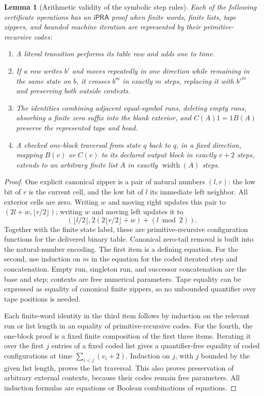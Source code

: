 \documentclass[11pt]{article}
\newtheorem{lemma}{Lemma}
\newcommand{\ipra}{\mathsf{iPRA}}
\begin{document}
\begin{lemma}[Arithmetic validity of the symbolic step rules]
Each of the following certificate operations has an $\ipra$ proof when
finite words, finite lists, tape zippers, and bounded machine iteration are
represented by their primitive-recursive codes:
\begin{enumerate}
\item A literal transition performs its table row and adds one to time.
\item If a row writes $b'$ and moves repeatedly in one direction while
      remaining in the same state on $b$, it crosses $b^m$ in exactly $m$
      steps, replacing it with $b'^m$ and preserving both outside contexts.
\item The identities combining adjacent equal-symbol runs, deleting empty
      runs, absorbing a finite zero suffix into the blank exterior, and
      $C(A)1=1B(A)$ preserve the represented tape and head.
\item A checked one-block traversal from state $q$ back to $q$, in a fixed
      direction, mapping $B(v)$ or $C(v)$ to its declared output block in
      exactly $v+2$ steps, extends to an arbitrary finite list $A$ in
      exactly $\operatorname{width}(A)$ steps.
\end{enumerate}
\end{lemma}
\begin{proof}
One explicit canonical zipper is a pair of natural numbers $(l,r)$:
the low bit of $r$ is the current cell, and the low bit of $l$ its immediate
left neighbor. All exterior cells are zero. Writing $w$ and moving right
updates this pair to $(2l+w,\lfloor r/2\rfloor)$; writing $w$ and moving
left updates it to
\[
 (\lfloor l/2\rfloor,
 2(2\lfloor r/2\rfloor+w)+(l\bmod2)).
\]
Together with the finite state label, these are primitive-recursive
configuration functions for the delivered binary table. Canonical
zero-tail removal is built into the natural-number encoding.
The first item is a defining equation. For the second, use induction on
$m$ in the equation for the coded iterated step and concatenation. Empty
run, singleton run, and successor concatenation are the base and step;
contexts are free numerical parameters. Tape equality can be expressed
as equality of canonical finite zippers, so no unbounded quantifier over
tape positions is needed.

Each finite-word identity in the third item follows by induction on the
relevant run or list length in an equality of primitive-recursive codes.
For the fourth, the one-block proof is a fixed finite composition of the
first three items. Iterating it over the first $j$ entries of a fixed
coded list gives a quantifier-free equality of coded configurations at
time $\sum_{i<j}(v_i+2)$. Induction on $j$, with $j$ bounded by the given
list length, proves the list traversal. This also proves preservation of
arbitrary external contexts, because their codes remain free parameters.
All induction formulas are equations or Boolean combinations of equations.
\end{proof}
\end{document}
